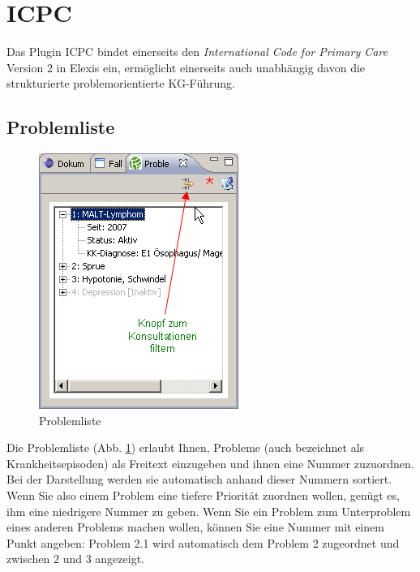 
\section{ICPC}
Das Plugin ICPC bindet einerseits den \textit{International Code for Primary Care} Version 2 in Elexis ein, ermöglicht einerseits auch unabhängig davon die strukturierte problemorientierte KG-Führung.
\subsection{Problemliste}
\begin{figure}
  \includegraphics{images/problemliste1}
  \caption{Problemliste}\label{fig:problemliste}
\end{figure}

Die Problemliste (Abb. \ref{fig:problemliste}) erlaubt Ihnen, Probleme (auch bezeichnet als Krankheitsepisoden) als Freitext einzugeben und ihnen eine Nummer zuzuordnen. Bei der Darstellung werden sie automatisch anhand dieser Nummern sortiert. Wenn Sie also einem Problem eine tiefere Priorität zuordnen wollen, genügt es, ihm eine niedrigere Nummer zu geben. Wenn Sie ein Problem zum Unterproblem eines anderen Problems machen wollen, können Sie eine Nummer mit einem Punkt angeben: Problem 2.1 wird automatisch dem Problem 2 zugeordnet und zwischen 2 und 3 angezeigt.

